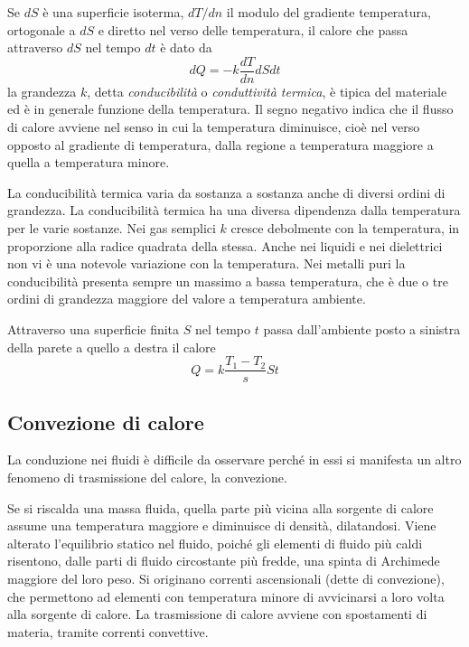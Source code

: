 \documentclass[class=book, crop=false, oneside, 12pt]{standalone}
\begin{document}
Se \(d S\) è una superficie isoterma, \(d T / d n\) il modulo del gradiente temperatura, ortogonale a \(d S\) e diretto nel verso delle temperatura, il calore che passa attraverso \(d S\) nel tempo \(d t\) è dato da
\begin{equation}
    d Q = - k \frac{d T }{d n} d S d t
\end{equation}
la grandezza \(k\), detta \emph{conducibilità} o \emph{conduttività termica}, è tipica del materiale ed è in generale funzione della temperatura.
Il segno negativo indica che il flusso di calore avviene nel senso in cui la temperatura diminuisce, cioè nel verso opposto al gradiente di temperatura, dalla regione a temperatura maggiore a quella a temperatura minore.

La conducibilità termica varia da sostanza a sostanza anche di diversi ordini di grandezza.
La conducibilità termica ha una diversa dipendenza dalla temperatura per le varie sostanze. 
Nei gas semplici \(k\) cresce debolmente con la temperatura, in proporzione alla radice quadrata della stessa. 
Anche nei liquidi e nei dielettrici non vi è una notevole variazione con la temperatura. 
Nei metalli puri la conducibilità presenta sempre un massimo a bassa temperatura, che è due o tre ordini di grandezza maggiore del valore a temperatura ambiente.

Attraverso una superficie finita \(S\) nel tempo \(t\) passa dall'ambiente posto a sinistra della parete a quello a destra il calore 
\begin{equation*}
    Q = k \frac{T_1 - T_2}{s} S t
\end{equation*}

\subsection{Convezione di calore}

La conduzione nei fluidi è difficile da osservare perché in essi si manifesta un altro fenomeno di trasmissione del calore, la convezione.

Se si riscalda una massa fluida, quella parte più vicina alla sorgente di calore assume una temperatura maggiore e diminuisce di densità, dilatandosi. 
Viene alterato l'equilibrio statico nel fluido, poiché gli elementi di fluido più caldi risentono, dalle parti di fluido circostante più fredde, una spinta di Archimede maggiore del loro peso. 
Si originano correnti ascensionali (dette di convezione), che permettono ad elementi con temperatura minore di avvicinarsi a loro volta alla sorgente di calore. 
La trasmissione di calore avviene con spostamenti di materia, tramite correnti convettive. 
\end{document}
